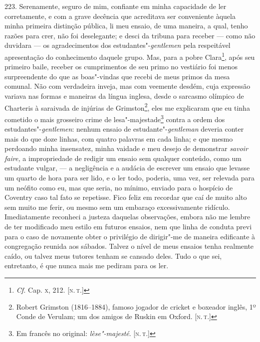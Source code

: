 223. Serenamente, seguro de mim, confiante em minha capacidade de ler
corretamente, e com a grave decência que acreditava ser conveniente
àquela minha primeira distinção pública, li meu ensaio, de uma maneira,
a qual, tenho razões para crer, não foi deselegante; e desci da tribuna
para receber --- como não duvidara --- os agradecimentos dos
estudantes"-\emph{gentlemen} pela respeitável apresentação do
conhecimento daquele grupo. Mas, para a pobre Clara\footnote{\emph{Cf.}
  Cap. \textsc{x}, 212. {[}\textsc{n.\,t.}{]}}, após seu primeiro baile, receber os
cumprimentos de seu primo no vestiário foi menos surpreendente do que as
boas"-vindas que recebi de meus primos da mesa comunal. Não com
verdadeira inveja, mas com veemente desdém, cuja expressão variava nas
formas e maneiras da língua inglesa, desde o sarcasmo olímpico de
Charteris à saraivada de injúrias de Grimston\footnote{Robert Grimston
  (1816--1884), famoso jogador de cricket e boxeador inglês, 1º Conde de
  Verulam; um dos amigos de Ruskin em Oxford. {[}\textsc{n.\,t.}{]}}, eles me
explicaram que eu tinha cometido o mais grosseiro crime de
lesa"-majestade\footnote{Em francês no original: \emph{lèse"-majesté}.
  {[}\textsc{n.\,t.}{]}} contra a ordem dos estudantes"-\emph{gentlemen}:
nenhum ensaio de estudante"-\emph{gentleman} deveria conter mais do que
doze linhas, com quatro palavras em cada linha; e que mesmo perdoando
minha insensatez, minha vaidade e meu desejo de demonstrar \emph{savoir
faire,} a impropriedade de redigir um ensaio sem qualquer conteúdo, como
um estudante vulgar, --- a negligência e a audácia de escrever um ensaio
que levasse um quarto de hora para ser lido, e o ler todo, poderia, uma
vez, ser relevada para um neófito como eu, mas que seria, no mínimo,
enviado para o hospício de Coventry caso tal fato se repetisse. Fico
feliz em recordar que caí de muito alto sem muito me ferir, ou mesmo sem
um embaraço excessivamente ridículo. Imediatamente reconheci a justeza
daquelas observações, embora não me lembre de ter modificado meu estilo
em futuros ensaios, nem que linha de conduta previ para o caso de
novamente obter o privilégio de dirigir"-me de maneira edificante à
congregação reunida aos sábados. Talvez o nível de meus ensaios tenha
realmente caído, ou talvez meus tutores tenham se cansado deles. Tudo o
que sei, entretanto, é que nunca mais me pediram para os ler.

